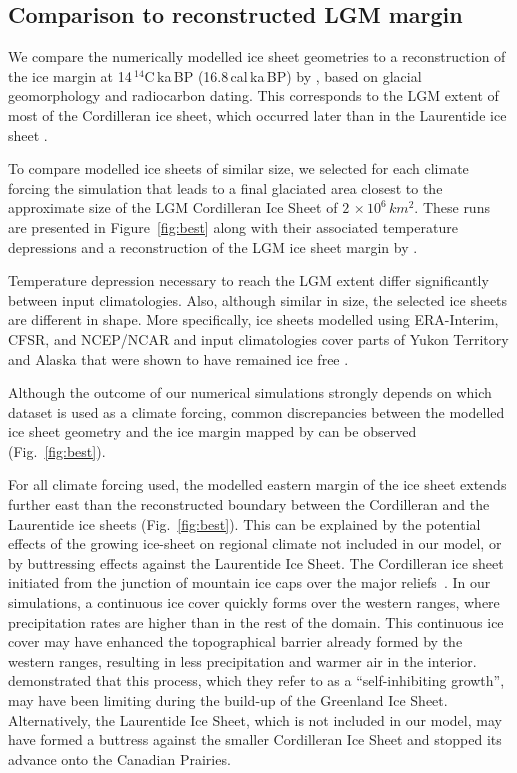 \subsection{Comparison to reconstructed LGM margin}

We compare the numerically modelled ice sheet geometries to a reconstruction of the ice margin at 14\,$^{14}$C\,ka\,BP (16.8\,cal\,ka\,BP) by \citet{dyke-2004}, based on glacial geomorphology and radiocarbon dating. This corresponds to the LGM extent of most of the Cordilleran ice sheet, which occurred later than in the Laurentide ice sheet \citep{dyke-2004}.

To compare modelled ice sheets of similar size, we selected for each climate forcing the simulation that leads to a final glaciated area closest to the approximate size of the LGM Cordilleran Ice Sheet of $2\,\times10^6\,\unit{km^2}$. These runs are presented in Figure~\ref{fig:best} along with their associated temperature depressions and a reconstruction of the LGM ice sheet margin by \citet{dyke-2004}.

Temperature depression necessary to reach the LGM extent differ significantly between input climatologies. Also, although similar in size, the selected ice sheets are different in shape. More specifically, ice sheets modelled using ERA-Interim, CFSR,  and NCEP/NCAR and  input climatologies cover parts of Yukon Territory and Alaska that were shown to have remained ice free \citep{dukrodkin-1999,kaufman-manley-2004}.

Although the outcome of our numerical simulations strongly depends on which dataset is used as a climate forcing, common discrepancies between the modelled ice sheet geometry and the ice margin mapped by \citet{dyke-2004} can be observed (Fig.~\ref{fig:best}).

For all climate forcing used, the modelled eastern margin of the ice sheet extends further east than the reconstructed boundary between the Cordilleran and the Laurentide ice sheets (Fig.~\ref{fig:best}). This can be explained by the potential effects of the growing ice-sheet on regional climate not included in our model, or by buttressing effects against the Laurentide Ice Sheet. The Cordilleran ice sheet initiated from the junction of mountain ice caps over the major reliefs~\citep{clague-1989}. In our simulations, a continuous ice cover quickly forms over the western ranges, where precipitation rates are higher than in the rest of the domain. This continuous ice cover may have enhanced the topographical barrier already formed by the western ranges, resulting in less precipitation and warmer air in the interior. \citet{langen-etal-2012} demonstrated that this process, which they refer to as a ``self-inhibiting growth'', may have been limiting during the build-up of the Greenland Ice Sheet. Alternatively, the Laurentide Ice Sheet, which is not included in our model, may have formed a buttress against the smaller Cordilleran Ice Sheet and stopped its advance onto the Canadian Prairies.

